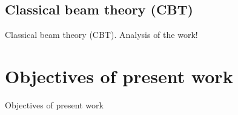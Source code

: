 \documentclass[a4paper, 12pt ]{report}
\begin{document}
	\subsection{Classical beam theory (CBT)}
	Classical beam theory (CBT). Analysis of the work! \cite{article}
	\section{Objectives of present work}
	Objectives of present work
	
	
	
	
	\newpage
	\pagestyle{plain}
	{\\}
	\begin{spacing}{1.5}
		\renewcommand\bibname{}
		\vspace*{-5\baselineskip}
		\begingroup
		\let\clearpage\relax
		{}
		
		\endgroup
	\end{spacing}
	
\end{document}

